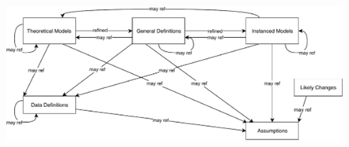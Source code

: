 \documentclass[12pt]{article}
\begin{document}
%
%
%
%
%
%
\begin{figure}[H]
  \includegraphics[scale=0.9]{RelationsBetweenTM_GD_IM_DD_A.pdf}
\end{figure}
\end{document}
